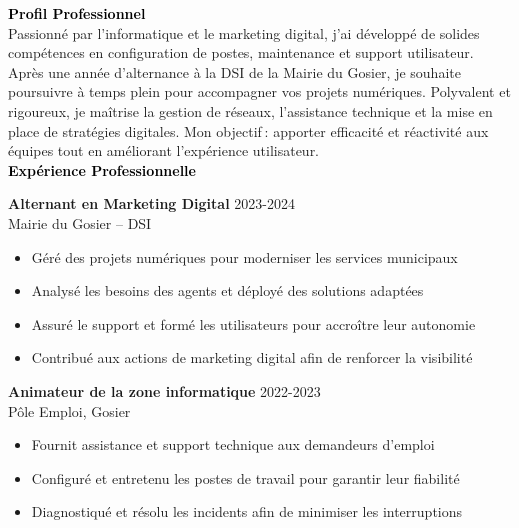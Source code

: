 \documentclass{article}
\begin{document}
\begin{paracol}{2}
\switchcolumn
\color{black}

\textcolor{black}{\Large \textbf{Profil Professionnel}} \\[2pt]
Passionné par l’informatique et le marketing digital, j’ai développé de solides compétences en configuration de postes, maintenance et support utilisateur. Après une année d’alternance à la DSI de la Mairie du Gosier, je souhaite poursuivre à temps plein pour accompagner vos projets numériques. Polyvalent et rigoureux, je maîtrise la gestion de réseaux, l’assistance technique et la mise en place de stratégies digitales. Mon objectif : apporter efficacité et réactivité aux équipes tout en améliorant l’expérience utilisateur. \\[8pt]

\textcolor{black}{\Large \textbf{Expérience Professionnelle}} \\[2pt]

\colorbox{maincolor}{%
  \begin{minipage}{\linewidth}
    \textbf{Alternant en Marketing Digital}   2023-2024  \\ Mairie du Gosier – DSI 
    \begin{itemize}
      \item Géré des projets numériques pour moderniser les services municipaux \item Analysé les besoins des agents et déployé des solutions adaptées \item Assuré le support et formé les utilisateurs pour accroître leur autonomie \item Contribué aux actions de marketing digital afin de renforcer la visibilité
    \end{itemize}
  \end{minipage}}

\vspace{3mm}


\colorbox{maincolor}{%
  \begin{minipage}{\linewidth}
    \textbf{Animateur de la zone informatique}   2022-2023  \\ Pôle Emploi, Gosier 
    \begin{itemize}
      \item Fournit assistance et support technique aux demandeurs d’emploi \item Configuré et entretenu les postes de travail pour garantir leur fiabilité \item Diagnostiqué et résolu les incidents afin de minimiser les interruptions
    \end{itemize}
  \end{minipage}}


\end{paracol}
\end{document}
